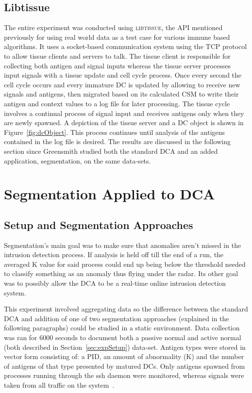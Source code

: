 \documentclass{umm-senior-sem}
\begin{document}
\subsection{Libtissue}
The entire experiment was conducted using \textsc{libtissue}, the API mentioned previously for using real world data as a test case for various immune based algorithms. It uses a socket-based communication system using the TCP protocol to allow tissue clients and servers to talk. The tissue client is responsible for collecting both antigen and signal inputs whereas the tissue server processes input signals with a tissue update and cell cycle process. Once every second the cell cycle occurs and every immature DC is updated by allowing to receive new signals and antigens, then migrated based on its calculated CSM to write their antigen and context values to a log file for later processing. The tissue cycle involves a continual process of signal input and receives antigens only when they are newly spawned. A depiction of the tissue server and a DC object is shown in Figure~\ref{fig:dcObject}. This process continues until analysis of the antigens contained in the log file is desired. The results are discussed in the following section since Greensmith studied both the standard DCA and an added application, segmentation, on the same data-sets.

\section{Segmentation Applied to DCA}
\label{sec:Segmentation Applied to DCA}
\subsection{Setup and Segmentation Approaches}
Segmentation's main goal was to make sure that anomalies aren't missed in the intrusion detection process. If analysis is held off till the end of a run, the averaged K value for said process could end up being below the threshold needed to classify something as an anomaly thus flying under the radar. Its other goal was to possibly allow the DCA to be a real-time online intrusion detection system.

This experiment involved aggregating data so the difference between the standard DCA and addition of one of two segmentation approaches (explained in the following paragraphs) could be studied in a static environment. Data collection was ran for 6000 seconds to document both a passive normal and active normal (both described in Section~\ref{sec:expSetup}) data-set. Antigen types were stored in vector form consisting of: a PID, an amount of abnormality (K) and the number of antigens of that type presented by matured DCs. Only antigens spawned from processes running through the ssh daemon were monitored, whereas signals were taken from all traffic on the system~\cite{greensmith_thesis:2007}.
\end{document}

